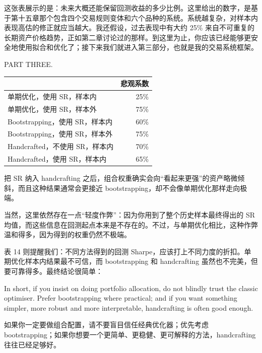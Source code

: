 \begin{chineseblock}这张表展示的是：未来大概还能保留回测收益的多少比例。这里给出的数字，是基于第十五章那个包含四个交易规则变体和六个品种的系统。系统越复杂，对样本内表现高估的修正就应当越大。我还假设，过去表现中有大约 25\% 来自不可重复的长期资产价格趋势，正如第二章讨论过的那样。到这里为止，你应该已经能够更安全地使用拟合和优化了；接下来我们就进入第三部分，也就是我的交易系统框架。\end{chineseblock}

\bipairgap

\begin{englishblock} PART THREE. \end{englishblock}

\begin{chinesetableblock} \begingroup \small \centering \begin{tabular}{@{} lr@{}}
\toprule
& 悲观系数 \\
\midrule
单期优化，使用 SR，样本内 & 25\% \\
单期优化，使用 SR，样本外 & 75\% \\
Bootstrapping，使用 SR，样本内 & 60\% \\
Bootstrapping，使用 SR，样本外 & 75\% \\
Handcrafted，不使用 SR，样本内 & 70\% \\
Handcrafted，使用 SR，样本内 & 65\% \\
\bottomrule
\end{tabular}
\par \endgroup \end{chinesetableblock}

把 SR 纳入 handcrafting 之后，组合权重确实会向“看起来更强”的资产略微倾斜，而且这种结果通常会更接近 bootstrapping，却不会像单期优化那样走向极端。

\begin{chineseblock}当然，这里依然存在一点“轻度作弊”：因为你用到了整个历史样本最终得出的 SR 均值，而这些信息在回测起点本来是不存在的。不过，与单期优化相比，这种作弊温和得多，因为得到的权重仍然不极端。\end{chineseblock}

表 14 则提醒我们：不同方法得到的回测 Sharpe，应该打上不同力度的折扣。单期优化样本内结果最不可信，而 bootstrapping 和 handcrafting 虽然也不完美，但要可靠得多。最终结论很简单：

\begin{englishblock} In short, if you insist on doing portfolio allocation, do not blindly trust the classic optimiser. Prefer bootstrapping where practical; and if you want something simpler, more robust and more interpretable, handcrafting is often good enough. \end{englishblock}

\begin{chineseblock}如果你一定要做组合配置，请不要盲目信任经典优化器；优先考虑 bootstrapping；如果你想要一个更简单、更稳健、更可解释的方法，handcrafting 往往已经足够好。\end{chineseblock}
